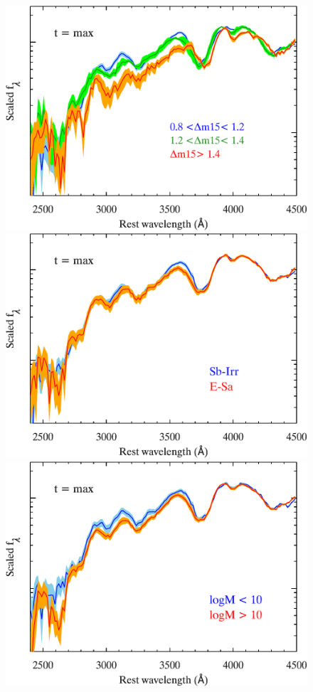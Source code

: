 \documentclass[useAMS,usenatbib]{mn2e}
\begin{document}
\begin{figure}
	\centering
		\includegraphics[scale=0.49]{plot/mean_spec_dm15_max_log.pdf}
		\hspace{0.25cm}
		\includegraphics[scale=0.49]{plot/mean_spec_max_morph_log.pdf}\\
		\vspace{0.25cm}
		\includegraphics[scale=0.49]{plot/mean_spec_max_mass_log.pdf}

\end{figure}
\end{document}
